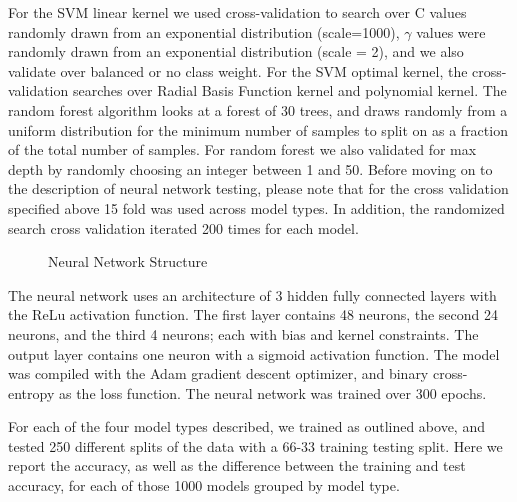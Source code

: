 \documentclass[12pt]{article}
\begin{document}
For the SVM linear kernel we used cross-validation to search over C values randomly drawn from an exponential distribution (scale=1000), $\gamma$ values were randomly drawn from an exponential distribution (scale = 2), and we also validate over balanced or no class weight. For the SVM optimal kernel, the cross-validation searches over Radial Basis Function kernel and polynomial kernel. The random forest algorithm looks at a forest of 30 trees, and draws randomly from a uniform distribution for the minimum number of samples to split on as a fraction of the total number of samples. For random forest we also validated for max depth by randomly choosing an integer between 1 and 50. Before moving on to the description of neural network testing, please note that for the cross validation specified above 15 fold was used across model types. In addition, the randomized search cross validation iterated 200 times for each model.

\begin{figure}[H]
\caption{Neural Network Structure}
\end{figure}

The neural network uses an architecture of 3 hidden fully connected layers with the ReLu activation function. The first layer contains 48 neurons, the second 24 neurons, and the third 4 neurons; each with bias and kernel constraints. The output layer contains one neuron with a sigmoid activation function. The model was compiled with the Adam gradient descent optimizer, and binary cross-entropy as the loss function. The neural network was trained over 300 epochs. 

For each of the four model types described, we trained as outlined above, and tested 250 different splits of the data with a 66-33 training testing split. Here we report the accuracy, as well as the difference between the training and test accuracy, for each of those 1000 models grouped by model type.
\end{document}
